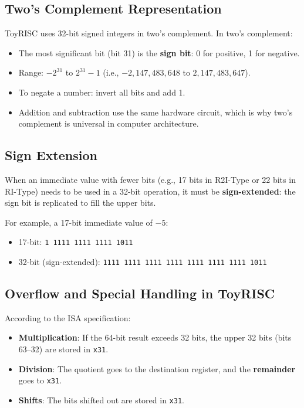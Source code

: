 \documentclass[12pt,a4paper]{article}
\begin{document}
\subsection{Two's Complement Representation}

ToyRISC uses 32-bit signed integers in two's complement. In two's complement:

\begin{itemize}
    \item The most significant bit (bit 31) is the \textbf{sign bit}: 0 for positive, 1 for negative.
    \item Range: $-2^{31}$ to $2^{31} - 1$ (i.e., $-2,147,483,648$ to $2,147,483,647$).
    \item To negate a number: invert all bits and add 1.
    \item Addition and subtraction use the same hardware circuit, which is why two's complement is universal in computer architecture.
\end{itemize}

\subsection{Sign Extension}

When an immediate value with fewer bits (e.g., 17 bits in R2I-Type or 22 bits in RI-Type) needs to be used in a 32-bit operation, it must be \textbf{sign-extended}: the sign bit is replicated to fill the upper bits.

For example, a 17-bit immediate value of $-5$:
\begin{itemize}
    \item 17-bit: \texttt{1 1111 1111 1111 1011}
    \item 32-bit (sign-extended): \texttt{1111 1111 1111 1111 1111 1111 1111 1011}
\end{itemize}

\subsection{Overflow and Special Handling in ToyRISC}

According to the ISA specification:
\begin{itemize}
    \item \textbf{Multiplication}: If the 64-bit result exceeds 32 bits, the upper 32 bits (bits 63--32) are stored in \texttt{x31}.
    \item \textbf{Division}: The quotient goes to the destination register, and the \textbf{remainder} goes to \texttt{x31}.
    \item \textbf{Shifts}: The bits shifted out are stored in \texttt{x31}.
\end{itemize}
\end{document}

